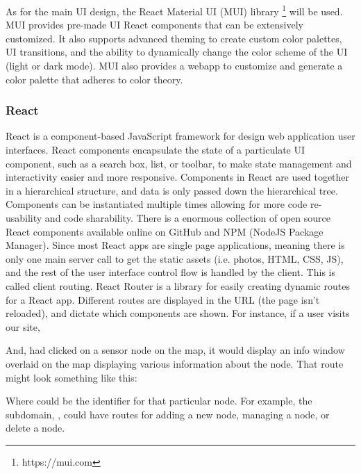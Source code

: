 As for the main UI design, the React Material UI (MUI) library \footnote{https://mui.com} will be
used. MUI provides pre-made UI React components that can be extensively customized. It also supports
advanced theming to create custom color palettes, UI transitions, and the ability to dynamically
change the color scheme of the UI (light or dark mode). MUI also provides a webapp to customize and
generate a color palette that adheres to color theory.


\subsubsection{React}
React is a component-based JavaScript framework for design web application user interfaces. React
components encapsulate the state of a particulate UI component, such as a search box, list, or
toolbar, to make state management and interactivity easier and more responsive. Components in React
are used together in a hierarchical structure, and data is only passed down the hierarchical tree.
Components can be instantiated multiple times allowing for more code re-usability and code
sharability. There is a enormous collection of open source React components available online on
GitHub and NPM (NodeJS Package Manager). Since most React apps are single page applications, meaning
there is only one main server call to get the static assets (i.e. photos, HTML, CSS, JS), and the
rest of the user interface control flow is handled by the client. This is called client routing.
React Router is a library for easily creating dynamic routes for a React app. Different routes are
displayed in the URL (the page isn't reloaded), and dictate which components are shown. For
instance, if a user visits our site,


And, had clicked on a sensor node on the map, it would display an info window
overlaid on the map displaying various information about the node. That route might look something
like this:


Where  could be the identifier for that particular node. For example, the subdomain,
, could have routes for adding a new node, managing a node, or delete a node.

